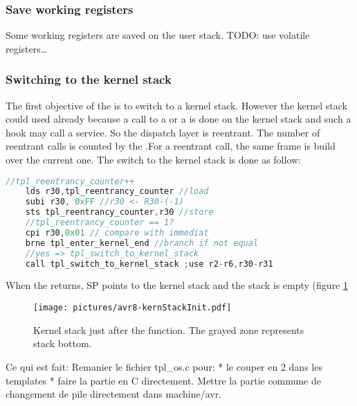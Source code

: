 \subsubsection{Save working registers}
Some working registers are saved on the user stack. TODO: use volatile registers…

\subsubsection{Switching to the kernel stack}
The first objective of the  is to switch to a kernel stack. However the kernel stack could used already because a call to a  or a  is done on the kernel stack and such a hook may call a service. So the dispatch layer is reentrant. The number of reentrant calls is counted by the .For a reentrant call, the same frame is build over the current one. The switch to the kernel stack is done as follow:

\begin{lstlisting}[language=C]
	//tpl_reentrancy_counter++
	lds r30,tpl_reentrancy_counter //load
	subi r30, 0xFF //r30 <- R30-(-1)
	sts tpl_reentrancy_counter,r30 //store
	//tpl_reentrancy_counter == 1?
	cpi r30,0x01 // compare with immediat
	brne tpl_enter_kernel_end //branch if not equal
	//yes => tpl_switch_to_kernel_stack
	call tpl_switch_to_kernel_stack ;use r2-r6,r30-r31
\end{lstlisting}

When the  returns, SP points to the kernel stack and the stack is empty (figure \ref{fig:avr8kernStackInit}
\begin{figure}[htbp] %
\begin{minipage}{0.5\textwidth}
    \centering
  \texttt{[image: pictures/avr8-kernStackInit.pdf]} 
\end{minipage}
\begin{minipage}{0.5\textwidth}
   \caption{Kernel stack just after the  function. The grayed zone represents stack bottom.}
   \label{fig:avr8kernStackInit}
\end{minipage}
\end{figure}



Ce qui est fait:
Remanier le fichier tpl_os.c pour:
* le couper en 2 dans les templates
* faire la partie en C directement. Mettre la partie commune de changement de pile directement dans
machine/avr.


